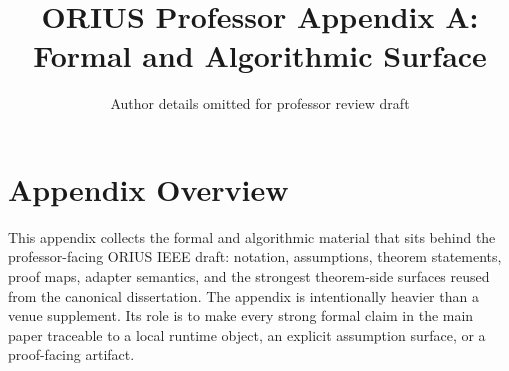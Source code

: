 \documentclass[10pt,journal,onecolumn]{IEEEtran}
\title{ORIUS Professor Appendix A: Formal and Algorithmic Surface}
\author{Author details omitted for professor review draft}
\date{}
\begin{document}
\maketitle

\section{Appendix Overview}
\label{sec:prof-app-a-overview}

This appendix collects the formal and algorithmic material that sits behind the
professor-facing ORIUS IEEE draft: notation, assumptions, theorem statements, proof
maps, adapter semantics, and the strongest theorem-side surfaces reused from the
canonical dissertation. The appendix is intentionally heavier than a venue supplement.
Its role is to make every strong formal claim in the main paper traceable to a local
runtime object, an explicit assumption surface, or a proof-facing artifact.

\label{app:verified-theorems-gap-audit}
\label{ch:ablations}
\label{ch:battery-to-orius}
\label{ch:cert-half-life-blackout}
\label{ch:compositional-safety-fleets}
\label{ch:graceful-degradation}
\label{ch:main-results}





\end{document}
